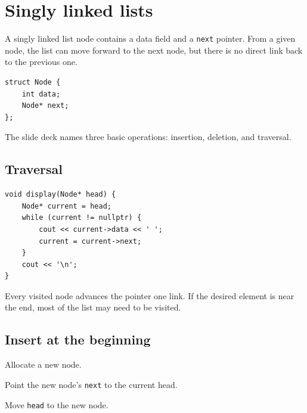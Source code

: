 \begin{utpfigure}
\end{utpfigure}

\section{Singly linked lists}

A singly linked list node contains a data field and a \texttt{next} pointer. From a given node, the list can move forward to the next node, but there is no direct link back to the previous one.

\begin{lstlisting}
struct Node {
    int data;
    Node* next;
};
\end{lstlisting}

The slide deck names three basic operations: insertion, deletion, and traversal.

\subsection{Traversal}

\begin{lstlisting}
void display(Node* head) {
    Node* current = head;
    while (current != nullptr) {
        cout << current->data << ' ';
        current = current->next;
    }
    cout << '\n';
}
\end{lstlisting}

Every visited node advances the pointer one link. If the desired element is near the end, most of the list may need to be visited.

\subsection{Insert at the beginning}

\begin{utpsteps}
  \item Allocate a new node.
  \item Point the new node's \texttt{next} to the current head.
  \item Move \texttt{head} to the new node.
\end{utpsteps}

